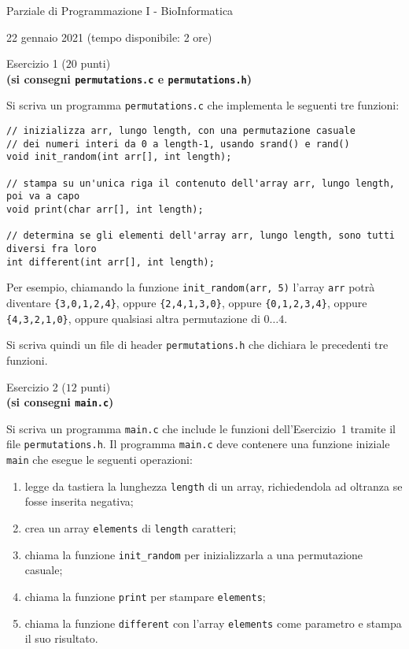 \documentclass[12pt]{article}
\begin{document}
\begin{center}{\LARGE Parziale di Programmazione I - BioInformatica}\\
\vspace*{-2ex}
\begin{center}
  \large 22 gennaio 2021 (tempo disponibile: 2 ore)
\end{center}
\end{center}

\vspace*{1ex}
\begin{center}{\Large Esercizio 1} ($20$ punti)\\
  \textbf{(si consegni \texttt{permutations.c} e \texttt{permutations.h})}
\end{center}
Si scriva un programma \texttt{permutations.c} che implementa le seguenti tre funzioni:
\begin{verbatim}
// inizializza arr, lungo length, con una permutazione casuale
// dei numeri interi da 0 a length-1, usando srand() e rand()
void init_random(int arr[], int length);

// stampa su un'unica riga il contenuto dell'array arr, lungo length, poi va a capo
void print(char arr[], int length);

// determina se gli elementi dell'array arr, lungo length, sono tutti diversi fra loro
int different(int arr[], int length);
\end{verbatim}
%
Per esempio, chiamando la funzione \texttt{init\_random(arr, 5)} l'array \texttt{arr} potr\`a diventare
\texttt{\{3,0,1,2,4\}}, oppure \texttt{\{2,4,1,3,0\}},
oppure \texttt{\{0,1,2,3,4\}}, oppure \texttt{\{4,3,2,1,0\}}, oppure qualsiasi altra
permutazione di $0\ldots 4$.

Si scriva quindi un file di header \texttt{permutations.h} che dichiara le precedenti tre funzioni.

\begin{center}{\Large Esercizio 2} ($12$ punti)\\
  \textbf{(si consegni \texttt{main.c})}\end{center}
%
Si scriva un programma \texttt{main.c} che include le funzioni dell'Esercizio~1 tramite
il file \texttt{permutations.h}.
Il programma \texttt{main.c} deve contenere una funzione iniziale \texttt{main} che esegue
le seguenti operazioni:
\begin{enumerate}
\item legge da tastiera la lunghezza \texttt{length} di un array, richiedendola ad oltranza se fosse inserita negativa;
\item crea un array \texttt{elements} di \texttt{length} caratteri;
\item chiama la funzione \texttt{init\_random} per inizializzarla a una permutazione casuale;
\item chiama la funzione \texttt{print} per stampare \texttt{elements};
\item chiama la funzione \texttt{different} con l'array \texttt{elements} come parametro e stampa il suo risultato.
\end{enumerate}
\end{document}
